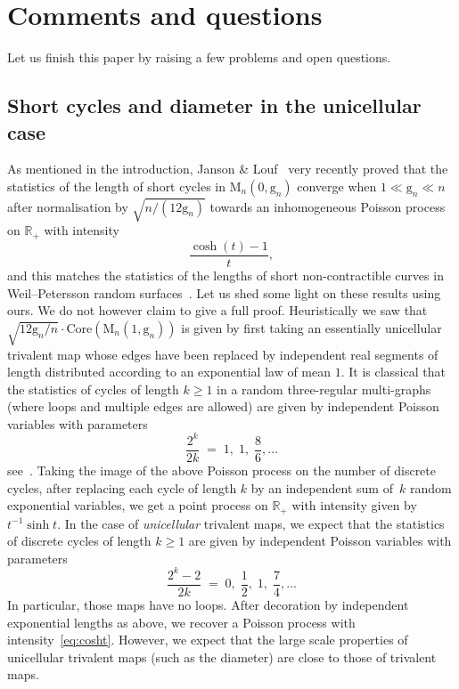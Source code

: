 \documentclass[10pt]{amsart}
\theoremstyle{plain}
\theoremstyle{definition}
\theoremstyle{remark}
\newcommand{\R}{\mathbb{R}}
\newcommand{\Map}{\mathrm{M}}
\newcommand{\gen}{\mathrm{g}}
\begin{document}
\section{Comments and questions}
\label{sec:comments}

Let us finish this paper by raising a few problems and open questions.

\subsection{Short cycles and diameter in the unicellular case}

As mentioned in the introduction, Janson \& Louf~\cite{JL21b} very recently proved that the statistics of the length of short cycles in $ \Map_{n}(0, \gen_{n})$ converge when $ 1 \ll \gen_n \ll n$ after normalisation by $ \sqrt{n/(12 \gen_{n})}$ towards an inhomogeneous Poisson process on $\R_{+}$ with intensity
\begin{equation}\label{eq:cosht}
\frac{\cosh (t)-1}{t},
\end{equation}
and this matches the statistics of the lengths of short non-contractible curves in Weil--Petersson random surfaces~\cite{MP19}. Let us shed some light on these results using ours. We do not however claim to give a full proof. Heuristically we saw that $ \sqrt{12 \gen_{n}/n} \cdot \mathrm{Core}(\Map_{n}(1, \gen_n))$ is given by first taking an essentially unicellular trivalent map whose edges have been replaced by independent real segments of length distributed according to an exponential law of mean $1$.
It is classical that the statistics of cycles of length $k\geq 1$ in a random three-regular multi-graphs (where loops and multiple edges are allowed) are given by independent Poisson variables with parameters
\[
\frac{2^k}{2k} \;=\; 1,\;1,\;\frac{8}{6}, \dots
\]
see~\cite[Th.\,2.5]{Wor99}. Taking the image of the above Poisson process on the number of discrete cycles, after replacing each cycle of length $k$ by an independent sum of~$k$ random exponential variables, we get a point process on $\R_{+}$ with intensity given by $t^{-1} \sinh t$. In the case of \emph{unicellular} trivalent maps, we expect that the statistics of discrete cycles of length $k\geq 1$ are given by independent Poisson variables with parameters
\[
\frac{2^{k}-2}{2k} \;=\; 0,\;\frac{1}{2},\;1,\;\frac{7}{4}, \dots
\]
In particular, those maps have no loops. After decoration by independent exponential lengths as above, we recover a Poisson process with intensity~\eqref{eq:cosht}. However, we expect that the large scale properties of unicellular trivalent maps (such as the diameter) are close to those of trivalent maps.
\end{document}
